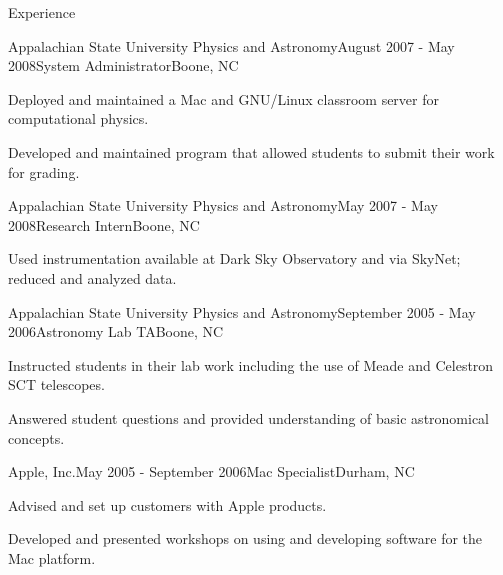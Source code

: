 \documentclass{cv} %
\begin{document}
\begin{rSection}{Experience}
\begin{rSubsection}{Appalachian State University Physics and Astronomy}{August 2007 - May 2008}{System Administrator}{Boone, NC}
\item Deployed and maintained a Mac and GNU/Linux classroom server for computational physics.
\item Developed and maintained program that allowed students to submit their work for grading.
\end{rSubsection}

\begin{rSubsection}{Appalachian State University Physics and Astronomy}{May 2007 - May 2008}{Research Intern}{Boone, NC}
\item Used instrumentation available at Dark Sky Observatory and via SkyNet; reduced and analyzed data.
\end{rSubsection}

\begin{rSubsection}{Appalachian State University Physics and Astronomy}{September 2005 - May 2006}{Astronomy Lab TA}{Boone, NC}
\item Instructed students in their lab work including the use of Meade and Celestron SCT telescopes.
\item Answered student questions and provided understanding of basic astronomical concepts.
\end{rSubsection}

\begin{rSubsection}{Apple, Inc.}{May 2005 - September 2006}{Mac Specialist}{Durham, NC}
\item Advised and set up customers with Apple products.
\item Developed and presented workshops on using and developing software for the Mac platform.
\end{rSubsection}

\end{rSection}

\end{document}
